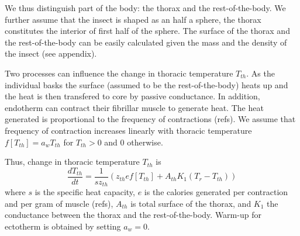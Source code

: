 We thus distinguish part of the body: the thorax and the rest-of-the-body.
We further assume that the insect is shaped as an half a sphere, the thorax constitutes the interior of first half of the sphere.
The surface of the thorax and the rest-of-the-body can be easily calculated given the mass and the density of the insect (see appendix).

Two processes can influence the change in thoracic temperature $T_{th}$.
As the individual basks the surface (assumed to be the rest-of-the-body) heats up and the heat is then transfered to core by passive conductance.
In addition, endotherm can contract their fibrillar muscle to generate heat.
The heat generated is proportional to the frequency of contractions (refs).
We assume that frequency of contraction increases linearly with thoracic temperature $f[T_{th}]  = a_w T_{th}$ for $T_{th}> 0$ and 0 otherwise.

Thus, change in thoracic temperature $T_{th}$ is 
\begin{equation} \label{eq:dTh}
	\frac{dT_{th}}{dt} = \frac{1}{s z_{th}} (z_{th} e f[T_{th}] +  A_{th} K_1(T_r - T_{th}))
\end{equation}
where $s$ is the specific heat capacity, $e$ is the calories generated per contraction and per gram of muscle (refs), $A_{th}$ is total surface of the thorax, and $K_1$ the conductance between the thorax and the rest-of-the-body.
Warm-up for ectotherm is obtained by setting $a_w = 0$.

